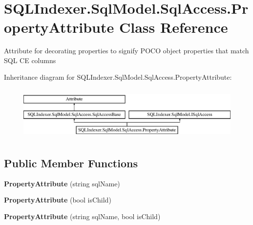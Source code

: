 \hypertarget{class_s_q_l_indexer_1_1_sql_model_1_1_sql_access_1_1_property_attribute}{\section{S\-Q\-L\-Indexer.\-Sql\-Model.\-Sql\-Access.\-Property\-Attribute Class Reference}
\label{class_s_q_l_indexer_1_1_sql_model_1_1_sql_access_1_1_property_attribute}
}


Attribute for decorating properties to signify P\-O\-C\-O object properties that match S\-Q\-L C\-E columns  


Inheritance diagram for S\-Q\-L\-Indexer.\-Sql\-Model.\-Sql\-Access.\-Property\-Attribute\-:\begin{figure}[H]
\begin{center}
\leavevmode
\includegraphics[height=2.745098cm]{class_s_q_l_indexer_1_1_sql_model_1_1_sql_access_1_1_property_attribute}
\end{center}
\end{figure}
\subsection*{Public Member Functions}
\begin{DoxyCompactItemize}
\item 
\hypertarget{class_s_q_l_indexer_1_1_sql_model_1_1_sql_access_1_1_property_attribute_aaf60d2d950c1965ee3afa3a4c9f796b1}{{\bfseries Property\-Attribute} (string sql\-Name)}\label{class_s_q_l_indexer_1_1_sql_model_1_1_sql_access_1_1_property_attribute_aaf60d2d950c1965ee3afa3a4c9f796b1}

\item 
\hypertarget{class_s_q_l_indexer_1_1_sql_model_1_1_sql_access_1_1_property_attribute_a855da381c033318fd729091272803cd6}{{\bfseries Property\-Attribute} (bool is\-Child)}\label{class_s_q_l_indexer_1_1_sql_model_1_1_sql_access_1_1_property_attribute_a855da381c033318fd729091272803cd6}

\item 
\hypertarget{class_s_q_l_indexer_1_1_sql_model_1_1_sql_access_1_1_property_attribute_a58b0016d4c33860aef06a06d6ed4d8f4}{{\bfseries Property\-Attribute} (string sql\-Name, bool is\-Child)}\label{class_s_q_l_indexer_1_1_sql_model_1_1_sql_access_1_1_property_attribute_a58b0016d4c33860aef06a06d6ed4d8f4}

\end{DoxyCompactItemize}
